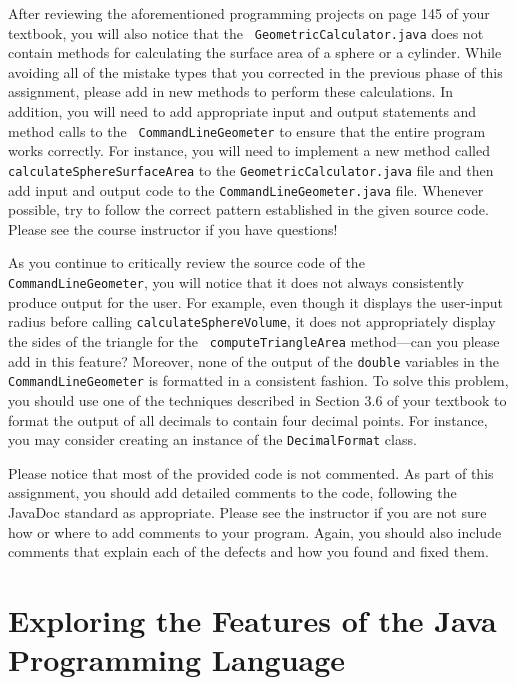 \documentclass[11pt]{article}
\begin{document}
\begin{sloppypar}
  After reviewing the aforementioned programming projects on
  page 145 of your textbook, you will also notice that the {\tt
  GeometricCalculator.java} does not contain methods for calculating the surface
  area of a sphere or a cylinder. While avoiding all of the mistake types that
  you corrected in the previous phase of this assignment, please add in new
  methods to perform these calculations. In addition, you will need to add
  appropriate input and output statements and method calls to the {\tt
  CommandLineGeometer} to ensure that the entire program works correctly. For
  instance, you will need to implement a new method called {\tt
  calculateSphereSurfaceArea} to the {\tt GeometricCalculator.java} file and
  then add input and output code to the {\tt CommandLineGeometer.java} file.
  Whenever possible, try to follow the correct pattern established in the given
  source code. Please see the course instructor if you have questions!
\end{sloppypar}

As you continue to critically review the source code of the {\tt
CommandLineGeometer}, you will notice that it does not always consistently
produce output for the user. For example, even though it displays the
user-input radius before calling {\tt calculateSphereVolume}, it does not
appropriately display the sides of the triangle for the {\tt
computeTriangleArea} method---can you please add in this feature? Moreover,
none of the output of the {\tt double} variables in the {\tt
CommandLineGeometer} is formatted in a consistent fashion. To solve this
problem, you should use one of the techniques described in Section 3.6 of your
textbook to format the output of all decimals to contain four decimal points.
For instance, you may consider creating an instance of the {\tt DecimalFormat}
class.

Please notice that most of the provided code is not commented. As part of this
assignment, you should add detailed comments to the code, following the JavaDoc
standard as appropriate. Please see the instructor if you are not sure how or
where to add comments to your program. Again, you should also include comments
that explain each of the defects and how you found and fixed them.

\section*{Exploring the Features of the Java Programming Language}
\end{document}
